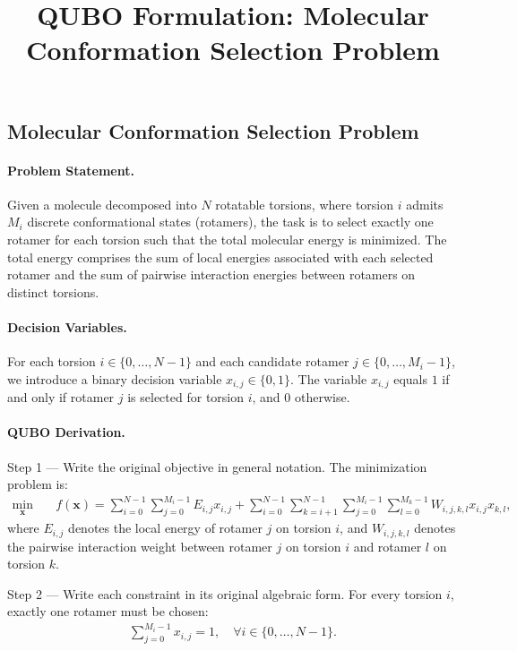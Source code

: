\documentclass[12pt]{article}
\title{QUBO Formulation: Molecular Conformation Selection Problem}
\date{}
\begin{document}
\maketitle

\subsection*{Molecular Conformation Selection Problem}

\paragraph{Problem Statement.}
Given a molecule decomposed into $N$ rotatable torsions, where torsion $i$ admits $M_i$ discrete conformational states (rotamers), the task is to select exactly one rotamer for each torsion such that the total molecular energy is minimized. The total energy comprises the sum of local energies associated with each selected rotamer and the sum of pairwise interaction energies between rotamers on distinct torsions.

\paragraph{Decision Variables.}
For each torsion $i \in \{0, \dots, N-1\}$ and each candidate rotamer $j \in \{0, \dots, M_i-1\}$, we introduce a binary decision variable $x_{i,j} \in \{0,1\}$. The variable $x_{i,j}$ equals $1$ if and only if rotamer $j$ is selected for torsion $i$, and $0$ otherwise.

\paragraph{QUBO Derivation.}
Step 1 --- Write the original objective in general notation. The minimization problem is:
\begin{align}
\min_{\mathbf{x}} \quad & f(\mathbf{x}) = \sum_{i=0}^{N-1} \sum_{j=0}^{M_i-1} E_{i,j} x_{i,j} + \sum_{i=0}^{N-1} \sum_{k=i+1}^{N-1} \sum_{j=0}^{M_i-1} \sum_{l=0}^{M_k-1} W_{i,j,k,l} x_{i,j} x_{k,l},
\end{align}
where $E_{i,j}$ denotes the local energy of rotamer $j$ on torsion $i$, and $W_{i,j,k,l}$ denotes the pairwise interaction weight between rotamer $j$ on torsion $i$ and rotamer $l$ on torsion $k$.

Step 2 --- Write each constraint in its original algebraic form. For every torsion $i$, exactly one rotamer must be chosen:
\begin{align}
\sum_{j=0}^{M_i-1} x_{i,j} = 1, \quad \forall i \in \{0, \dots, N-1\}.
\end{align}
\end{document}
